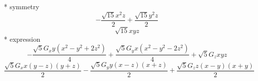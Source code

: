 \documentclass[fleqn,8pt]{jsarticle}
\begin{document}
\noindent\quad ** symmetry
\begin{dmath*}
- \frac{\sqrt{15} x^{2} z}{2} + \frac{\sqrt{15} y^{2} z}{2}
\end{dmath*}
\begin{dmath*}
\sqrt{15} x y z
\end{dmath*}
\noindent\quad ** expression
\begin{dmath*}
- \frac{\sqrt{5} G_{x} y \left(x^{2} - y^{2} + 2 z^{2}\right)}{4} + \frac{\sqrt{5} G_{y} x \left(x^{2} - y^{2} - 2 z^{2}\right)}{4} + \sqrt{5} G_{z} x y z
\end{dmath*}
\begin{dmath*}
\frac{\sqrt{5} G_{x} x \left(y - z\right) \left(y + z\right)}{2} - \frac{\sqrt{5} G_{y} y \left(x - z\right) \left(x + z\right)}{2} + \frac{\sqrt{5} G_{z} z \left(x - y\right) \left(x + y\right)}{2}
\end{dmath*}
\end{document}
